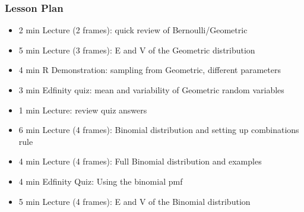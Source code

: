 \begin{frame}
    \frametitle{Lesson Plan}
    \begin{itemize}
        \item 2 min Lecture (2 frames): quick review of Bernoulli/Geometric
        \item 5 min Lecture (3 frames): E and V of the Geometric distribution
        \item 4 min R Demonstration: sampling from Geometric, different parameters
        \item 3 min Edfinity quiz: mean and variability of Geometric random variables
        \item 1 min Lecture: review quiz answers

        \item 6 min Lecture (4 frames): Binomial distribution and setting up combinations rule
        \item 4 min Lecture (4 frames): Full Binomial distribution and examples
        \item 4 min Edfinity Quiz: Using the binomial pmf
        \item 5 min Lecture (4 frames): E and V of the Binomial distribution
        

    \end{itemize}
\end{frame}


